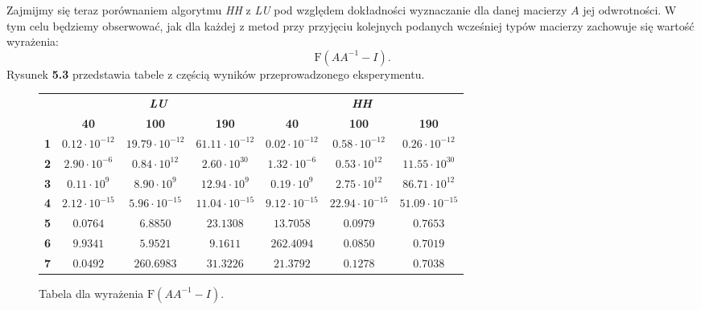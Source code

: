 Zajmijmy się teraz porównaniem algorytmu \textit{HH} z \textit{LU} pod względem dokładności wyznaczanie dla
danej macierzy $A$ jej odwrotności. W tym celu będziemy obserwować, jak dla każdej z metod przy przyjęciu kolejnych
podanych wcześniej typów macierzy zachowuje się wartość wyrażenia:
$$\mathrm{F}(AA^{-1} - I).$$
Rysunek \textbf{5.3} przedstawia tabele z częścią wyników przeprowadzonego eksperymentu.
\begin{figure}[h!tb]
\begin{center}
\begin{tabular}{|l||c|c|c||c|c|c|}
\hline
\multirow{2}{*}{} & \multicolumn{3}{|c||}{\textbf{\textit{LU}}} & \multicolumn{3}{|c|}{\textbf{\textit{HH}}}\\
\cline{2-7}
& \textbf{40} & \textbf{100} & \textbf{190} & \textbf{40} & \textbf{100} & \textbf{190} \\
\hline
\hline
\textbf{1} & $0.12 \cdot 10^{-12}$ & $19.79 \cdot 10^{-12}$ & $61.11 \cdot 10^{-12}$ & $0.02 \cdot 10^{-12}$ & $0.58 \cdot 10^{-12}$ & $0.26 \cdot 10^{-12}$ \\
\hline
\textbf{2} & $2.90 \cdot 10^{-6}$ & $0.84 \cdot 10^{12}$ & $2.60 \cdot 10^{30}$ & $1.32 \cdot 10^{-6}$ & $0.53 \cdot 10^{12} $ & $11.55 \cdot 10^{30}$ \\
\hline
\textbf{3} & $0.11 \cdot 10^{9}$ & $8.90\cdot 10^{9}$ & $12.94\cdot 10^{9}$ & $0.19\cdot 10^{9}$ & $2.75\cdot 10^{12}$ & $86.71\cdot 10^{12}$ \\
\hline
\textbf{4} & $2.12 \cdot 10^{-15}$ & $5.96 \cdot 10^{-15}$ & $11.04 \cdot 10^{-15}$ & $9.12 \cdot 10^{-15}$ & $22.94 \cdot 10^{-15}$ & $51.09 \cdot 10^{-15}$ \\
\hline
\textbf{5} & $0.0764$ & $6.8850$ & $23.1308$ & $13.7058$ & $0.0979$ & $0.7653$ \\
\hline
\textbf{6} & $9.9341$ & $5.9521$ & $9.1611$ & $262.4094$ & $0.0850$ & $0.7019$ \\
\hline
\textbf{7} & $0.0492$ & $260.6983$ & $31.3226$ & $21.3792$ & $0.1278$ & $0.7038$ \\
\hline
\end{tabular}
\caption{Tabela dla wyrażenia $\mathrm{F}(AA^{-1}-I)$.} 
\end{center}
\end{figure}

 



